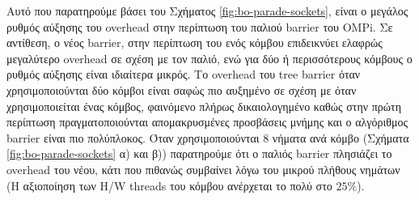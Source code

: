 Αυτό που παρατηρούμε βάσει του Σχήματος \ref{fig:bo-parade-sockets}, είναι ο μεγάλος ρυθμός αύξησης του overhead στην περίπτωση του παλιού barrier του OMPi. Σε αντίθεση, ο νέος barrier, στην περίπτωση του ενός κόμβου επιδεικνύει ελαφρώς μεγαλύτερο overhead σε σχέση με τον παλιό, ενώ για δύο ή περισσότερους κόμβους ο ρυθμός αύξησης είναι ιδιαίτερα μικρός. Το overhead του tree barrier όταν χρησιμοποιούνται δύο κόμβοι είναι σαφώς πιο αυξημένο σε σχέση με όταν χρησιμοποιείται ένας κόμβος, φαινόμενο πλήρως δικαιολογημένο καθώς στην πρώτη περίπτωση πραγματοποιούνται απομακρυσμένες προσβάσεις μνήμης και ο αλγόριθμος barrier είναι πιο πολύπλοκος. Όταν χρησιμοποιούνται 8 νήματα ανά κόμβο (Σχήματα \ref{fig:bo-parade-sockets} α) και β)) παρατηρούμε ότι ο παλιός barrier πλησιάζει το overhead του νέου, κάτι που πιθανώς συμβαίνει λόγω του μικρού πλήθους νημάτων (Η αξιοποίηση των H/W threads του κόμβου ανέρχεται το πολύ στο $25\%$).

